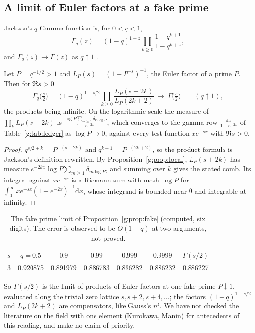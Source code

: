 \subsection{A limit of Euler factors at a fake prime}

Jackson's $q$ Gamma function \cite{Jackson04} is, for $0<q<1$,
\[
\Gamma_q(z)=(1-q)^{1-z}\prod_{k\ge0}\frac{1-q^{k+1}}{1-q^{k+z}},
\]
and $\Gamma_q(z)\to\Gamma(z)$ as $q\uparrow1$ \cite{GasperRahman04}.

\begin{proposition}\label{g:prop:fake}
Let $P=q^{-1/2}>1$ and $L_P(s)=(1-P^{-s})^{-1}$, the Euler factor of a prime $P$. Then for $\Re s>0$
\[
\Gamma_q\big(\tfrac s2\big)=(1-q)^{1-s/2}\prod_{k\ge0}\frac{L_P(s+2k)}{L_P(2k+2)}\ \longrightarrow\ \Gamma\big(\tfrac s2\big)\qquad(q\uparrow1),
\]
the products being infinite. On the logarithmic scale the measure of $\prod_kL_P(s+2k)$ is $\frac{\log P\sum_{m\ge1}\delta_{m\log P}}{1-e^{-2x}}$, which converges to the gamma row $\frac{\mathrm dx}{1-e^{-2x}}$ of Table~\ref{g:tab:ledger} as $\log P\to0$, against every test function $xe^{-sx}$ with $\Re s>0$.
\end{proposition}

\begin{proof}
$q^{s/2+k}=P^{-(s+2k)}$ and $q^{k+1}=P^{-(2k+2)}$, so the product formula is Jackson's definition rewritten. By Proposition~\ref{g:prop:local}, $L_P(s+2k)$ has measure $e^{-2kx}\log P\sum_{m\ge1}\delta_{m\log P}$, and summing over $k$ gives the stated comb. Its integral against $xe^{-sx}$ is a Riemann sum with mesh $\log P$ for $\int_0^\infty xe^{-sx}(1-e^{-2x})^{-1}\mathrm dx$, whose integrand is bounded near $0$ and integrable at infinity.
\end{proof}

\begin{table}[t]
\centering
\footnotesize
\begin{tabular}{lcccccc}
\toprule
$s$ & $q=0.5$ & $0.9$ & $0.99$ & $0.999$ & $0.9999$ & $\Gamma(s/2)$\\
\midrule
$3$ & 0.920875 & 0.891979 & 0.886783 & 0.886282 & 0.886232 & 0.886227\\
\bottomrule
\end{tabular}
\caption{The fake prime limit of Proposition~\ref{g:prop:fake} (computed, six digits). The error is observed to be $O(1-q)$ at two arguments, not proved.}
\label{g:tab:fake}
\end{table}

So $\Gamma(s/2)$ is the limit of products of Euler factors at one fake prime $P\downarrow1$, evaluated along the trivial zero lattice $s,s+2,s+4,\dots$; the factors $(1-q)^{1-s/2}$ and $L_P(2k+2)$ are compensators, like Gauss's $n^z$. We have not checked the literature on the field with one element (Kurokawa, Manin) for antecedents of this reading, and make no claim of priority.

